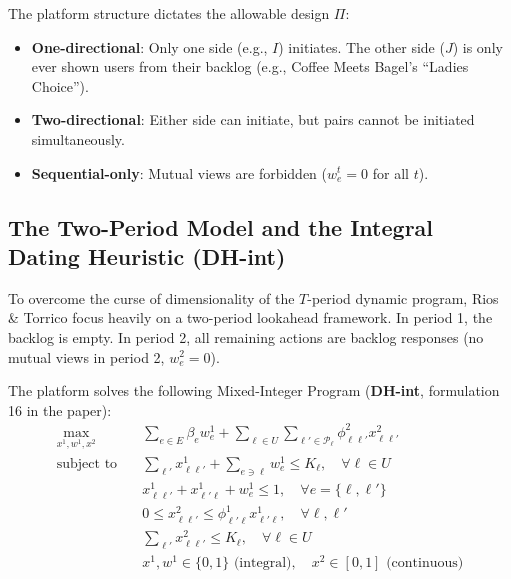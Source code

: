 \documentclass[11pt,letterpaper]{article}
\theoremstyle{definition}
\theoremstyle{plain}
\theoremstyle{remark}
\begin{document}
The platform structure dictates the allowable design $\Pi$:
\begin{itemize}[leftmargin=2em]
    \item \textbf{One-directional}: Only one side (e.g., $I$) initiates. The other side ($J$) is only ever shown users from their backlog (e.g., Coffee Meets Bagel's ``Ladies Choice'').
    \item \textbf{Two-directional}: Either side can initiate, but pairs cannot be initiated simultaneously.
    \item \textbf{Sequential-only}: Mutual views are forbidden ($w_e^t = 0$ for all $t$).
\end{itemize}

\subsection{The Two-Period Model and the Integral Dating Heuristic (DH-int)}
To overcome the curse of dimensionality of the $T$-period dynamic program, Rios \& Torrico focus heavily on a two-period lookahead framework. In period 1, the backlog is empty. In period 2, all remaining actions are backlog responses (no mutual views in period 2, $w_e^2 = 0$).

The platform solves the following Mixed-Integer Program (\textbf{DH-int}, formulation 16 in the paper):
\begin{align}
    \max_{x^1, w^1, x^2} \quad & \sum_{e \in E} \beta_e w_e^1 + \sum_{\ell \in U} \sum_{\ell' \in \mathcal{P}_\ell} \phi_{\ell\ell'}^2 x_{\ell\ell'}^2 \label{eq:dh_obj} \\
    \text{subject to} \quad & \sum_{\ell'} x_{\ell\ell'}^1 + \sum_{e \ni \ell} w_e^1 \le K_\ell, \quad \forall \ell \in U \tag{P1: Period 1 Capacity} \\
    & x_{\ell\ell'}^1 + x_{\ell'\ell}^1 + w_e^1 \le 1, \quad \forall e = \{\ell, \ell'\} \tag{P2: Single Exposure} \\
    & 0 \le x_{\ell\ell'}^2 \le \phi_{\ell'\ell}^1 x_{\ell'\ell}^1, \quad \forall \ell, \ell' \tag{P3: Backlog Feasibility} \\
    & \sum_{\ell'} x_{\ell\ell'}^2 \le K_\ell, \quad \forall \ell \in U \tag{P4: Period 2 Capacity} \\
    & x^1, w^1 \in \{0, 1\} \text{ (integral)}, \quad x^2 \in [0, 1] \text{ (continuous)} \tag{P5: Integrality}
\end{align}
\end{document}
